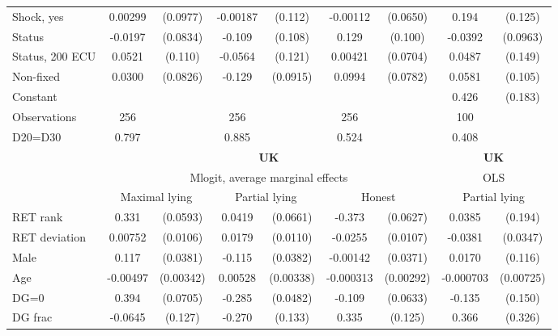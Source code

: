 \begin{tabular}{l|cccccc|cc}
Shock, yes    &  0.00299         & (0.0977)& -0.00187         &  (0.112)& -0.00112         & (0.0650)&    0.194         &  (0.125)\\
Status        &  -0.0197         & (0.0834)&   -0.109         &  (0.108)&    0.129         &  (0.100)&  -0.0392         & (0.0963)\\
Status, 200 ECU&   0.0521         &  (0.110)&  -0.0564         &  (0.121)&  0.00421         & (0.0704)&   0.0487         &  (0.149)\\
Non-fixed     &   0.0300         & (0.0826)&   -0.129         & (0.0915)&   0.0994         & (0.0782)&   0.0581         &  (0.105)\\
Constant        &                  &         &                  &         &                  &         &    0.426\sym{**} &  (0.183)\\
\hline
Observations    &      256         &         &      256         &         &      256         &         &      100         &         \\
D20=D30         &    0.797         &         &    0.885         &         &    0.524         &         &    0.408         &         \\
\hline\hline
&\multicolumn{6}{c|}{\bf UK}&\multicolumn{2}{c}{\bf UK}\\ &\multicolumn{6}{c|}{Mlogit, average marginal effects }&\multicolumn{2}{c}{OLS}\\
                &\multicolumn{2}{c}{Maximal lying}&\multicolumn{2}{c}{Partial lying}&\multicolumn{2}{c|}{Honest}  &\multicolumn{2}{c}{Partial lying}\\
\hline
RET rank        &    0.331\sym{***}& (0.0593)&   0.0419         & (0.0661)&   -0.373\sym{***}& (0.0627)&   0.0385         &  (0.194)\\
RET deviation   &  0.00752         & (0.0106)&   0.0179         & (0.0110)&  -0.0255\sym{**} & (0.0107)&  -0.0381         & (0.0347)\\
Male            &    0.117\sym{***}& (0.0381)&   -0.115\sym{***}& (0.0382)& -0.00142         & (0.0371)&   0.0170         &  (0.116)\\
Age             & -0.00497         &(0.00342)&  0.00528         &(0.00338)&-0.000313         &(0.00292)&-0.000703         &(0.00725)\\
DG=0          &    0.394\sym{***}& (0.0705)&   -0.285\sym{***}& (0.0482)&   -0.109\sym{*}  & (0.0633)&   -0.135         &  (0.150)\\
DG frac         &  -0.0645         &  (0.127)&   -0.270\sym{**} &  (0.133)&    0.335\sym{***}&  (0.125)&    0.366         &  (0.326)\\

\end{tabular}
